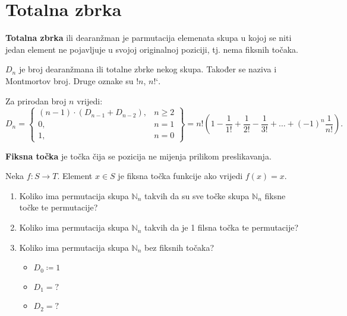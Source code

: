 \section{Totalna zbrka}

\textbf{Totalna zbrka} ili dearanžman je parmutacija elemenata skupa u kojoj se
niti jedan element ne pojavljuje u svojoj originalnoj poziciji, tj. nema fiksnih
točaka.

\bigskip
\noindent
$D_n$ je broj dearanžmana ili totalne zbrke nekog skupa. Također se naziva i Montmortov broj. Druge oznake su $!n$, $n\text{!`}$.

\begin{theorem}
    Za prirodan broj $n$ vrijedi:
    $$
        D_n = \begin{Bmatrix}
            (n-1) \cdot (D_{n - 1} + D_{n - 2}),&n \geq 2\\
            0,&n = 1\\
            1,&n = 0
        \end{Bmatrix} = n! \left(1-\frac{1}{1!} + \frac{1}{2!} - \frac{1}{3!} + \dots + (-1)^n \frac{1}{n!}\right).
    $$
\end{theorem}

\textbf{Fiksna točka} je točka čija se pozicija ne mijenja prilikom preslikavanja.

\begin{example}
    Neka $f:S\to T$. Element $x\in S$ je fiksna točka funkcije ako vrijedi $f(x)
    = x$.

    \begin{enumerate}
        \item Koliko ima permutacija skupa $\mathbb{N}_n$ takvih da su sve točke
        skupa $\mathbb{N}_n$ fiksne točke te permutacije?
        \item Koliko ima permutacija skupa $\mathbb{N}_n$ takvih da je 1 filsna
        točka te permutacije?
        \item Koliko ima permutacija skupa $\mathbb{N}_n$ bez fiksnih točaka?
        \begin{itemize}
            \item $D_0 \coloneq 1$
            \item $D_1 = ?$
            \item $D_2 = ?$
        \end{itemize}
    \end{enumerate}
\end{example}

